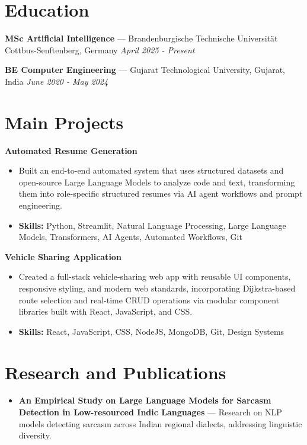 \documentclass[a4paper,10pt]{article}
\begin{document}
\section*{Education}
\textbf{MSc Artificial Intelligence} — Brandenburgische Technische Universität Cottbus-Senftenberg, Germany \hfill \textit{April 2025 - Present}\par
\vspace{1.5pt}
\textbf{BE Computer Engineering} — Gujarat Technological University, Gujarat, India \hfill \textit{June 2020 - May 2024}\par

\section*{Main Projects}
\textbf{Automated Resume Generation}\par
\vspace{1pt}
\begin{itemize}
  \item Built an end-to-end automated system that uses structured datasets and open-source Large Language Models to analyze code and text, transforming them into role-specific structured resumes via AI agent workflows and prompt engineering.
  \item \textbf{Skills:} Python, Streamlit, Natural Language Processing, Large Language Models, Transformers, AI Agents, Automated Workflows, Git
\end{itemize}
\vspace{3pt}
\textbf{Vehicle Sharing Application}\par
\vspace{1pt}
\begin{itemize}
  \item Created a full-stack vehicle-sharing web app with reusable UI components, responsive styling, and modern web standards, incorporating Dijkstra-based route selection and real-time CRUD operations via modular component libraries built with React, JavaScript, and CSS.
  \item \textbf{Skills:} React, JavaScript, CSS, NodeJS, MongoDB, Git, Design Systems
\end{itemize}

\section*{Research and Publications}
\begin{itemize}
\item \textbf{An Empirical Study on Large Language Models for Sarcasm Detection in Low-resourced Indic Languages} — Research on NLP models detecting sarcasm across Indian regional dialects, addressing linguistic diversity.
\end{itemize}
\end{document}
